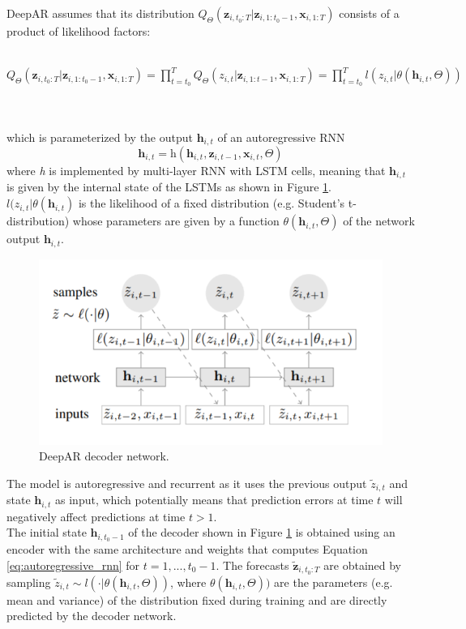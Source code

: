 \documentclass[a4paper, 12pt]{article} %
\begin{document}
	DeepAR assumes that its distribution $Q_{\Theta}(\pmb{z}_{i, t_0:T} | \pmb{z}_{i, 1:t_0-1}, \pmb{x}_{i, 1:T})$ consists of a product of likelihood factors:\\\\
	\centerline{
		$
		Q_{\Theta}(\pmb{z}_{i, t_0:T} | \pmb{z}_{i, 1:t_0-1}, \pmb{x}_{i, 1:T}) 
		= \prod_{t=t_0}^{T} Q_{\Theta}(z_{i, t} | \pmb{z}_{i, 1:t-1}, \pmb{x}_{i, 1:T})
		= \prod_{t=t_0}^{T} \textit{l}(z_{i,t} | \theta(\pmb{h}_{i,t}, \Theta))
		$
	}\\\\
	which is parameterized by the output $\pmb{h}_{i,t}$ of an autoregressive RNN
	\begin{equation} \label{eq:autoregressive_rnn}
		\pmb{h}_{i,t} = \textit{h}(\pmb{h}_{i,t}, \pmb{z}_{i, t-1}, \pmb{x}_{i, t}, \Theta )
	\end{equation}
	where \textit{h} is implemented by multi-layer RNN with LSTM cells, meaning that $\pmb{h}_{i,t}$ is given by the internal state of the LSTMs as shown in Figure \ref{fig:deepar}. \\
	$\textit{l}(z_{i,t} | \theta(\pmb{h}_{i,t})$ is the likelihood of a fixed distribution (e.g. Student's t-distribution) whose parameters are given by a function $\theta(\pmb{h}_{i,t}, \Theta)$ of the network output $\pmb{h}_{i,t}$.
	\begin{figure}
		\includegraphics[width=\linewidth]{img/deepar.png}
		\caption{DeepAR decoder network.}
		\label{fig:deepar}
	\end{figure}
	The model is autoregressive and recurrent as it uses the previous output $\tilde{z}_{i,t}$ and state $\pmb{h}_{i,t}$ as input, which potentially means that prediction errors at time $t$ will negatively affect predictions at time $t>1$. \\
	The initial state $\pmb{h}_{i,t_0-1}$ of the decoder shown in Figure \ref{fig:deepar} is obtained using an encoder with the same architecture and weights that computes Equation \ref{eq:autoregressive_rnn} for $t = 1, ..., t_0-1$. The forecasts $\tilde{\pmb{z}}_{i, t_0:T}$ are obtained by sampling $\tilde{z}_{i,t} \sim l(\cdot | \theta(\pmb{h}_{i,t}, \Theta))$, where $\theta(\pmb{h}_{i,t}, \Theta))$ are the parameters (e.g. mean and variance) of the distribution fixed during training and are directly predicted by the decoder network.
	
\end{document}
